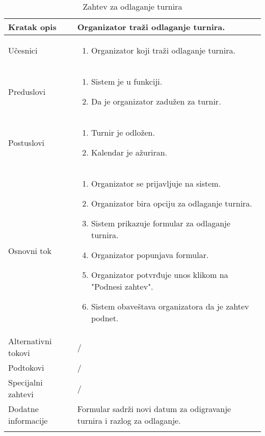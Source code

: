 \documentclass{article}
\begin{document}
\begin{longtable}{| p{} | p{} |} 
\hline
    Kratak opis & Organizator traži odlaganje turnira.\\ 
\hline    
    Učesnici & \begin{enumerate}
        \item Organizator koji traži odlaganje turnira.
    \end{enumerate}
    \\
\hline
   Preduslovi & \begin{enumerate}
       \item Sistem je u funkciji.
       \item Da je organizator zadužen za turnir.
   \end{enumerate}\\
\hline  
    Postuslovi & \begin{enumerate}
        \item Turnir je odložen. 
        \item Kalendar je ažuriran. 
    \end{enumerate}\\
\hline
    Osnovni tok & \begin{enumerate}
        \item Organizator se prijavljuje na sistem.
        \item Organizator bira opciju za odlaganje turnira.
        \item Sistem prikazuje formular za odlaganje turnira.
        \item Organizator popunjava formular.
        \item Organizator potvrđuje unos klikom na "Podnesi zahtev".
        \item Sistem obaveštava organizatora da je zahtev podnet.
    \end{enumerate}\\
\hline
    Alternativni tokovi & /\\
\hline
    Podtokovi & /\\
\hline
    Specijalni zahtevi & /\\
\hline
    Dodatne informacije & Formular sadrži novi datum za odigravanje turnira i razlog za odlaganje.\\
\hline

\caption{Zahtev za odlaganje turnira} 
\end{longtable}
\end{document}

